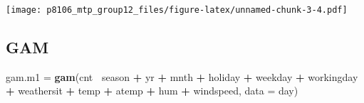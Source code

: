 \documentclass[]{article}
\newenvironment{Shaded}{\begin{snugshade}}{\end{snugshade}}
\newcommand{\KeywordTok}[1]{\textcolor[rgb]{0.13,0.29,0.53}{\textbf{#1}}}
\newcommand{\DataTypeTok}[1]{\textcolor[rgb]{0.13,0.29,0.53}{#1}}
\newcommand{\StringTok}[1]{\textcolor[rgb]{0.31,0.60,0.02}{#1}}
\newcommand{\OperatorTok}[1]{\textcolor[rgb]{0.81,0.36,0.00}{\textbf{#1}}}
\newcommand{\NormalTok}[1]{#1}
\begin{document}
\texttt{[image: p8106\_mtp\_group12\_files/figure-latex/unnamed-chunk-3-4.pdf]}

\subsection{GAM}\label{gam}

\begin{Shaded}
\begin{Highlighting}[]
\NormalTok{gam.m1 =}\StringTok{ }\KeywordTok{gam}\NormalTok{(cnt}\OperatorTok{~}\StringTok{ }\NormalTok{season }\OperatorTok{+}\StringTok{ }\NormalTok{yr }\OperatorTok{+}\StringTok{ }\NormalTok{mnth }\OperatorTok{+}\StringTok{ }\NormalTok{holiday }\OperatorTok{+}\StringTok{ }\NormalTok{weekday }\OperatorTok{+}\StringTok{ }\NormalTok{workingday }\OperatorTok{+}\StringTok{ }\NormalTok{weathersit }\OperatorTok{+}\StringTok{ }\NormalTok{temp }\OperatorTok{+}\StringTok{ }\NormalTok{atemp }\OperatorTok{+}\StringTok{ }\NormalTok{hum }\OperatorTok{+}\StringTok{ }\NormalTok{windspeed, }\DataTypeTok{data =}\NormalTok{ day)}


\end{Highlighting}
\end{Shaded}
\end{document}
